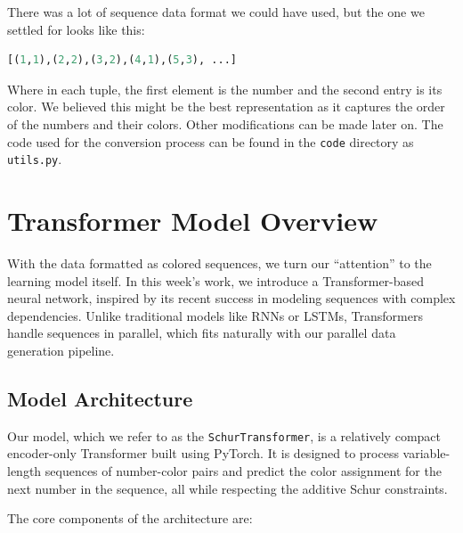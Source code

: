\documentclass[12pt]{article}
\begin{document}
There was a lot of sequence data format we could have used, but the one we settled for looks like this:
\begin{lstlisting}[language=Python]
    [(1,1),(2,2),(3,2),(4,1),(5,3), ...]
\end{lstlisting}
Where in each tuple, the first element is the number and the second entry is its color. We believed this might be the best representation as it captures the order of the numbers and their colors. Other modifications can be made later on.
The code used for the conversion process can be found in the \texttt{code} directory as \texttt{utils.py}.

\section{Transformer Model Overview}

With the data formatted as colored sequences, we turn our ``attention'' to the learning model itself. In this week’s work, we introduce a Transformer-based neural network, inspired by its recent success in modeling sequences with complex dependencies. Unlike traditional models like RNNs or LSTMs, Transformers handle sequences in parallel, which fits naturally with our parallel data generation pipeline.

\subsection{Model Architecture}

Our model, which we refer to as the \texttt{SchurTransformer}, is a relatively compact encoder-only Transformer built using PyTorch. It is designed to process variable-length sequences of number-color pairs and predict the color assignment for the next number in the sequence, all while respecting the additive Schur constraints.

The core components of the architecture are:
\end{document}
